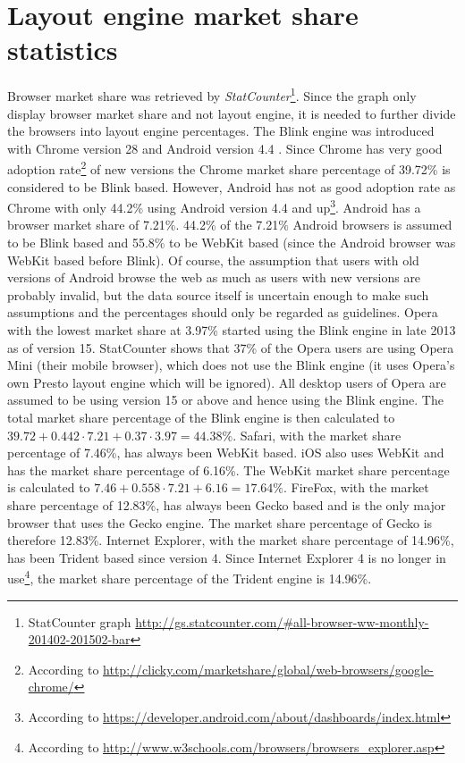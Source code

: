 \documentclass[a4paper,11pt]{kth-mag}
\begin{document}
        \section{Layout engine market share statistics}\label{sec:layout_engines_market_share}
          Browser market share was retrieved by \emph{StatCounter}\footnote{StatCounter graph \url{http://gs.statcounter.com/\#all-browser-ww-monthly-201402-201502-bar}}.
          Since the graph only display browser market share and not layout engine, it is needed to further divide the browsers into layout engine percentages.
          The Blink engine was introduced with Chrome version 28 and Android version 4.4 \cite{wiki_blink}.
          Since Chrome has very good adoption rate\footnote{According to \url{http://clicky.com/marketshare/global/web-browsers/google-chrome/}} of new versions the Chrome market share percentage of 39.72\% is considered to be Blink based.
          However, Android has not as good adoption rate as Chrome with only 44.2\% using Android version 4.4 and up\footnote{According to \url{https://developer.android.com/about/dashboards/index.html}}.
          Android has a browser market share of 7.21\%. 44.2\% of the 7.21\% Android browsers is assumed to be Blink based and 55.8\% to be WebKit based (since the Android browser was WebKit based before Blink).
          Of course, the assumption that users with old versions of Android browse the web as much as users with new versions are probably invalid, but the data source itself is uncertain enough to make such assumptions and the percentages should only be regarded as guidelines.
          Opera with the lowest market share at 3.97\% started using the Blink engine in late 2013 as of version 15.
          StatCounter shows that 37\% of the Opera users are using Opera Mini (their mobile browser), which does not use the Blink engine (it uses Opera's own Presto layout engine which will be ignored).
          All desktop users of Opera are assumed to be using version 15 or above and hence using the Blink engine.
          The total market share percentage of the Blink engine is then calculated to $39.72 + 0.442\cdot7.21 + 0.37\cdot3.97 = 44.38\%$.
          Safari, with the market share percentage of 7.46\%, has always been WebKit based.
          iOS also uses WebKit and has the market share percentage of 6.16\%.
          The WebKit market share percentage is calculated to $7.46 + 0.558\cdot7.21 + 6.16 = 17.64\%$.
          FireFox, with the market share percentage of 12.83\%, has always been Gecko based and is the only major browser that uses the Gecko engine.
          The market share percentage of Gecko is therefore 12.83\%.
          Internet Explorer, with the market share percentage of 14.96\%, has been Trident based since version 4.
          Since Internet Explorer 4 is no longer in use\footnote{According to \url{http://www.w3schools.com/browsers/browsers_explorer.asp}}, the market share percentage of the Trident engine is 14.96\%.
\end{document}
